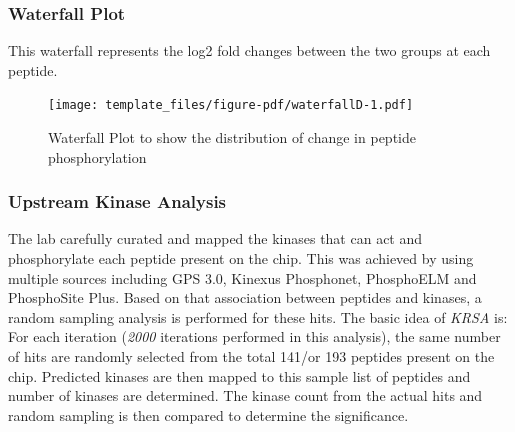 \documentclass[
  letterpaper,
  DIV=11,
  numbers=noendperiod]{scrreport}
\begin{document}
\hypertarget{waterfall-plot-3}{%
\subsubsection{Waterfall Plot}\label{waterfall-plot-3}}

This waterfall represents the log2 fold changes between the two groups
at each peptide.

\begin{figure}[htbp]

{\centering \texttt{[image: template\_files/figure-pdf/waterfallD-1.pdf]}

}

\caption{Waterfall Plot to show the distribution of change in peptide
phosphorylation}

\end{figure}

\hypertarget{upstream-kinase-analysis-3}{%
\subsubsection{Upstream Kinase
Analysis}\label{upstream-kinase-analysis-3}}

The lab carefully curated and mapped the kinases that can act and
phosphorylate each peptide present on the chip. This was achieved by
using multiple sources including GPS 3.0, Kinexus Phosphonet, PhosphoELM
and PhosphoSite Plus. Based on that association between peptides and
kinases, a random sampling analysis is performed for these hits. The
basic idea of \emph{KRSA} is: For each iteration (\emph{2000} iterations
performed in this analysis), the same number of hits are randomly
selected from the total 141/or 193 peptides present on the chip.
Predicted kinases are then mapped to this sample list of peptides and
number of kinases are determined. The kinase count from the actual hits
and random sampling is then compared to determine the significance.
\end{document}
